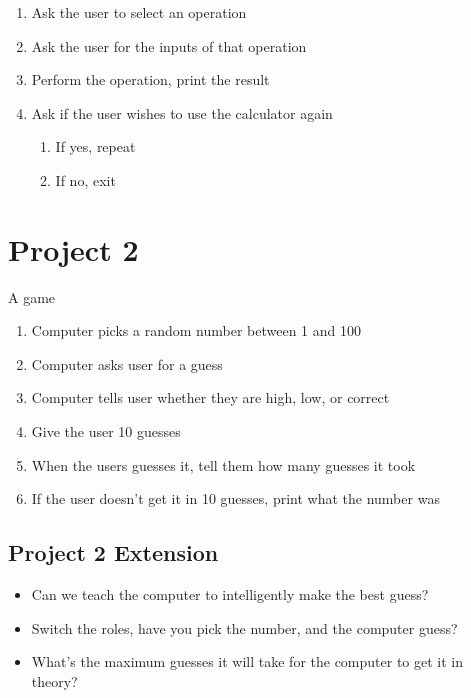 \documentclass[11pt]{article}
\begin{document}
\begin{enumerate}
\item Ask the user to select an operation
\item Ask the user for the inputs of that operation
\item Perform the operation, print the result
\item Ask if the user wishes to use the calculator again
\begin{enumerate}
\item If yes, repeat
\item If no, exit
\end{enumerate}
\end{enumerate}

\section{Project 2}
\label{sec:org11628e9}
A game

\begin{enumerate}
\item Computer picks a random number between 1 and 100
\item Computer asks user for a guess
\item Computer tells user whether they are high, low, or correct
\item Give the user 10 guesses
\item When the users guesses it, tell them how many guesses it took
\item If the user doesn't get it in 10 guesses, print what the number was
\end{enumerate}

\subsection{Project 2 Extension}
\label{sec:orgf1eae7f}
\begin{itemize}
\item Can we teach the computer to intelligently make the best guess?
\item Switch the roles, have you pick the number, and the computer guess?
\item What's the maximum guesses it will take for the computer to get it in theory?
\end{itemize}
\end{document}

